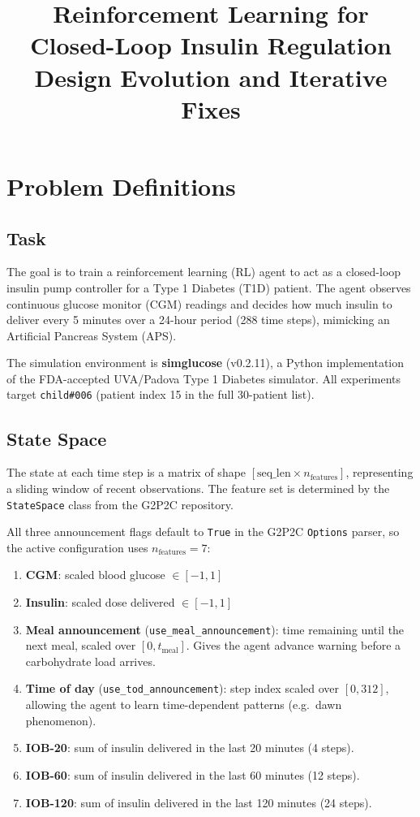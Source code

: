 \documentclass[11pt,a4paper]{article}
\title{\textbf{Reinforcement Learning for Closed-Loop Insulin Regulation}\\
\large Design Evolution and Iterative Fixes}
\author{}
\date{}
\begin{document}
\maketitle

\section{Problem Definitions}

\subsection{Task}
The goal is to train a reinforcement learning (RL) agent to act as a closed-loop insulin pump
controller for a Type 1 Diabetes (T1D) patient. The agent observes continuous glucose monitor
(CGM) readings and decides how much insulin to deliver every 5 minutes over a 24-hour period
(288 time steps), mimicking an Artificial Pancreas System (APS).

The simulation environment is \textbf{simglucose} (v0.2.11), a Python implementation of the
FDA-accepted UVA/Padova Type 1 Diabetes simulator. All experiments target \texttt{child\#006}
(patient index 15 in the full 30-patient list).

\subsection{State Space}

The state at each time step is a matrix of shape $[\text{seq\_len} \times n_\text{features}]$,
representing a sliding window of recent observations. The feature set is determined by the
\texttt{StateSpace} class from the G2P2C repository.

All three announcement flags default to \texttt{True} in the G2P2C \texttt{Options} parser,
so the active configuration uses $n_\text{features} = 7$:

\begin{enumerate}
    \item \textbf{CGM}: scaled blood glucose $\in [-1,1]$
    \item \textbf{Insulin}: scaled dose delivered $\in [-1,1]$
    \item \textbf{Meal announcement} (\texttt{use\_meal\_announcement}): time remaining
          until the next meal, scaled over $[0, t_\text{meal}]$. Gives the agent advance
          warning before a carbohydrate load arrives.
    \item \textbf{Time of day} (\texttt{use\_tod\_announcement}): step index scaled over
          $[0, 312]$, allowing the agent to learn time-dependent patterns
          (e.g.\ dawn phenomenon).
    \item \textbf{IOB-20}: sum of insulin delivered in the last 20 minutes (4 steps).
    \item \textbf{IOB-60}: sum of insulin delivered in the last 60 minutes (12 steps).
    \item \textbf{IOB-120}: sum of insulin delivered in the last 120 minutes (24 steps).
\end{enumerate}
\end{document}
